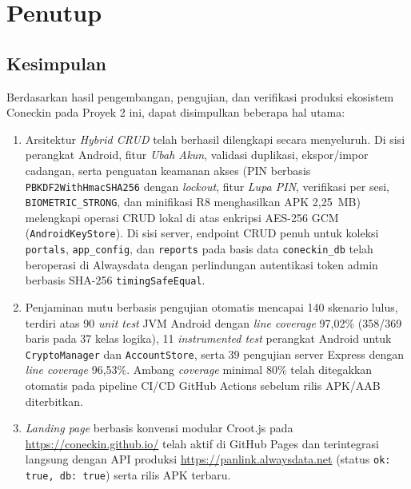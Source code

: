\chapter{Penutup}

\section{Kesimpulan}
Berdasarkan hasil pengembangan, pengujian, dan verifikasi produksi ekosistem Coneckin pada Proyek 2 ini, dapat disimpulkan beberapa hal utama:
\begin{enumerate}[leftmargin=*]
  \item Arsitektur \textit{Hybrid CRUD} telah berhasil dilengkapi secara menyeluruh. Di sisi perangkat Android, fitur \textit{Ubah Akun}, validasi duplikasi, ekspor/impor cadangan, serta penguatan keamanan akses (PIN berbasis \texttt{PBKDF2WithHmacSHA256} dengan \textit{lockout}, fitur \textit{Lupa PIN}, verifikasi per sesi, \texttt{BIOMETRIC\_STRONG}, dan minifikasi R8 menghasilkan APK 2,25~MB) melengkapi operasi CRUD lokal di atas enkripsi AES-256 GCM (\texttt{AndroidKeyStore}). Di sisi server, endpoint CRUD penuh untuk koleksi \texttt{portals}, \texttt{app\_config}, dan \texttt{reports} pada basis data \texttt{coneckin\_db} telah beroperasi di Alwaysdata dengan perlindungan autentikasi token admin berbasis SHA-256 \texttt{timingSafeEqual}.
  \item Penjaminan mutu berbasis pengujian otomatis mencapai 140 skenario lulus, terdiri atas 90 \textit{unit test} JVM Android dengan \textit{line coverage} 97,02\% (358/369 baris pada 37 kelas logika), 11 \textit{instrumented test} perangkat Android untuk \texttt{CryptoManager} dan \texttt{AccountStore}, serta 39 pengujian server Express dengan \textit{line coverage} 96,53\%. Ambang \textit{coverage} minimal 80\% telah ditegakkan otomatis pada pipeline CI/CD GitHub Actions sebelum rilis APK/AAB diterbitkan.
  \item \textit{Landing page} berbasis konvensi modular Croot.js pada \url{https://coneckin.github.io/} telah aktif di GitHub Pages dan terintegrasi langsung dengan API produksi \url{https://panlink.alwaysdata.net} (status \texttt{ok: true, db: true}) serta rilis APK terbaru.
\end{enumerate}

